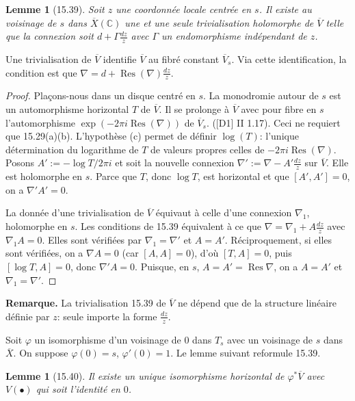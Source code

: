 \documentclass[12pt,a4paper]{article}
\theoremstyle{plain}
\newtheorem{lemma}[theorem]{Lemme}
\theoremstyle{definition}
\theoremstyle{remark}
\DeclareMathOperator{\Res}{Res}
\newcommand{\bC}{\mathbb{C}}
\begin{document}
\begin{lemma}[15.39]
Soit $z$ une coordonnée locale centrée en $s$. Il existe au voisinage de $s$ dans $\overline{X}(\bC)$ une et une seule trivialisation holomorphe de $\overline{V}$ telle que la connexion soit $d + \Gamma \frac{dz}{z}$ avec $\Gamma$ un endomorphisme indépendant de $z$.
\end{lemma}

Une trivialisation de $\overline{V}$ identifie $\overline{V}$ au fibré constant $\overline{V}_s$. Via cette identification, la condition est que $\nabla = d + \Res(\nabla) \frac{dz}{z}$.

\begin{proof}
Plaçons-nous dans un disque centré en $s$. La monodromie autour de $s$ est un automorphisme horizontal $T$ de $\overline{V}$. Il se prolonge à $\overline{V}$ avec pour fibre en $s$ l'automorphisme $\exp(-2\pi i \Res(\nabla))$ de $\overline{V}_s$. ([D1] II 1.17). Ceci ne requiert que 15.29(a)(b). L'hypothèse (c) permet de définir $\log(T)$: l'unique détermination du logarithme de $T$ de valeurs propres celles de $-2\pi i \Res(\nabla)$. Posons $A' := -\log T/2\pi i$ et soit la nouvelle connexion $\nabla' := \nabla - A' \frac{dz}{z}$ sur $\overline{V}$. Elle est holomorphe en $s$. Parce que $T$, donc $\log T$, est horizontal et que $[A', A'] = 0$, on a $\nabla' A' = 0$.

La donnée d'une trivialisation de $\overline{V}$ équivaut à celle d'une connexion $\nabla_1$, holomorphe en $s$. Les conditions de 15.39 équivalent à ce que $\nabla = \nabla_1 + A \frac{dz}{z}$ avec $\nabla_1 A = 0$. Elles sont vérifiées par $\nabla_1 = \nabla'$ et $A = A'$. Réciproquement, si elles sont vérifiées, on a $\nabla A = 0$ (car $[A,A] = 0$), d'où $[T, A] = 0$, puis $[\log T, A] = 0$, donc $\nabla' A = 0$. Puisque, en $s$, $A = A' = \Res \nabla$, on a $A = A'$ et $\nabla_1 = \nabla'$.
\end{proof}

\textbf{Remarque.} La trivialisation 15.39 de $\overline{V}$ ne dépend que de la structure linéaire définie par $z$: seule importe la forme $\frac{dz}{z}$.

Soit $\varphi$ un isomorphisme d'un voisinage de $0$ dans $T_s$ avec un voisinage de $s$ dans $\overline{X}$. On suppose $\varphi(0) = s$, $\varphi'(0) = 1$. Le lemme suivant reformule 15.39.

\begin{lemma}[15.40]
Il existe un unique isomorphisme horizontal de $\varphi^* \overline{V}$ avec $V(\bullet)$ qui soit l'identité en $0$.
\end{lemma}
\end{document}

